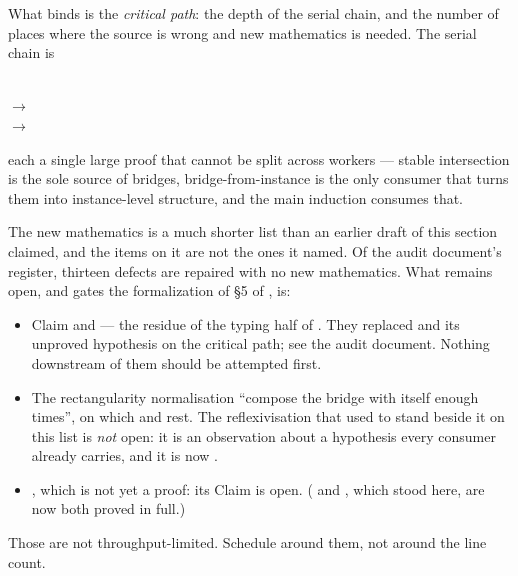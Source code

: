 What binds is the \emph{critical path}: the depth of the serial chain, and the
number of places where the source is wrong and new mathematics is needed. The
serial chain is
\begin{center}\small
{}\\[2pt]
$\longrightarrow$\ \\[2pt]
$\longrightarrow$\ 
\end{center}
each a single large proof that cannot be split across workers --- stable
intersection is the sole source of bridges, bridge-from-instance is the only
consumer that turns them into instance-level structure, and the main induction
consumes that.

The new mathematics is a much shorter list than an earlier draft of this
section claimed, and the items on it are not the ones it named. Of the audit
document's register, thirteen defects are repaired with no new mathematics.
What remains open, and gates the formalization of \S5 of
\cite{ZhukSimplified}, is:

\begin{itemize}\tightlist
\item Claim  and  --- the
  residue of the typing half of . They
  replaced  and its unproved hypothesis on the
  critical path; see the audit document. Nothing downstream of them should
  be attempted first.
\item The rectangularity normalisation ``compose the bridge with itself enough
  times'', on which  and
   rest. The reflexivisation that used to stand
  beside it on this list is \emph{not} open: it is an observation about a
  hypothesis every consumer already carries, and it is now
  .
\item {}, which is not yet a proof: its
  Claim  is open.
  ( and ,
  which stood here, are now both proved in full.)
\end{itemize}

Those are not throughput-limited. Schedule around them, not around the line
count.
